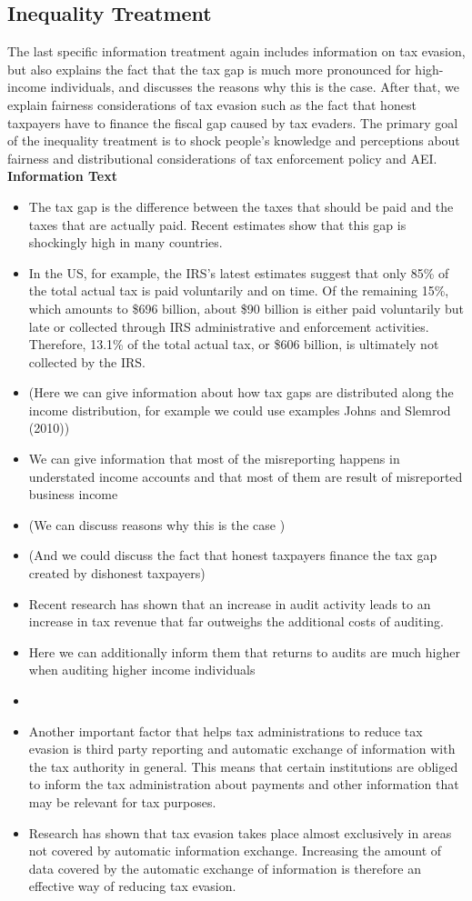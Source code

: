 \documentclass[12pt]{article}
\begin{document}
\subsection*{Inequality Treatment}
The last specific information treatment again includes information on tax evasion, but also explains the fact that the tax gap is much more pronounced for high-income individuals, and discusses the reasons why this is the case. After that, we explain fairness considerations of tax evasion such as the fact that honest taxpayers have to finance the fiscal gap caused by tax evaders. The primary goal of the inequality treatment is to shock people’s knowledge and perceptions about fairness and distributional considerations of tax enforcement policy and AEI. 
\textbf{Information Text}
\begin{itemize}
    \item The tax gap is the difference between the taxes that should be paid and the taxes that are actually paid. Recent estimates show that this gap is shockingly high in many countries.
    \item In the US, for example, the IRS's latest estimates suggest that only 85\% of the total actual tax is paid voluntarily and on time. Of the remaining 15\%, which amounts to \$696 billion, about \$90 billion is either paid voluntarily but late or collected through IRS administrative and enforcement activities. Therefore, 13.1\% of the total actual tax, or \$606 billion, is ultimately not collected by the IRS.
    \item (Here we can give information about how tax gaps are distributed along the income distribution, for example we could use examples Johns and Slemrod (2010))
    \item We can give information that most of the misreporting happens in understated income accounts and that most of them are result of misreported business income
    \item (We can discuss reasons why this is the case )
    \item (And we could discuss the fact that honest taxpayers finance the tax gap created by dishonest taxpayers)    
    \item Recent research has shown that an increase in audit activity leads to an increase in tax revenue that far outweighs the additional costs of auditing.
    \item Here we can additionally inform them that returns to audits are much higher when auditing higher income individuals
    \item 
    \item Another important factor that helps tax administrations to reduce tax evasion is third party reporting and automatic exchange of information with the tax authority in general. This means that certain institutions are obliged to inform the tax administration about payments and other information that may be relevant for tax purposes.
    \item Research has shown that tax evasion takes place almost exclusively in areas not covered by automatic information exchange. Increasing the amount of data covered by the automatic exchange of information is therefore an effective way of reducing tax evasion.

\end{itemize}
\end{document}
